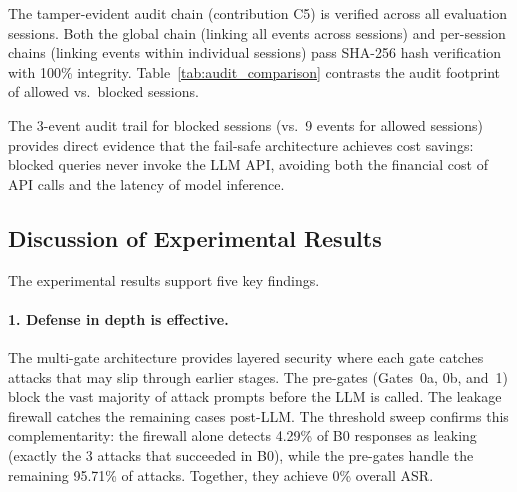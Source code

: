 \documentclass[journal,12pt,onecolumn,draftclsnofoot]{IEEEtran}
\begin{document}
The tamper-evident audit chain (contribution C5) is verified across all evaluation sessions. Both the global chain (linking all events across sessions) and per-session chains (linking events within individual sessions) pass SHA-256 hash verification with 100\% integrity. Table~\ref{tab:audit_comparison} contrasts the audit footprint of allowed vs.\ blocked sessions.

\begin{table}[!ht]
    \centering
    \caption{Audit Chain: Allowed vs.\ Blocked Session Comparison}
    \label{tab:audit_comparison}
\end{table}

The 3-event audit trail for blocked sessions (vs.\ 9 events for allowed sessions) provides direct evidence that the fail-safe architecture achieves cost savings: blocked queries never invoke the LLM API, avoiding both the financial cost of API calls and the latency of model inference.

\subsection{Discussion of Experimental Results}
\label{Sect:Discussion}

The experimental results support five key findings.

\paragraph{1. Defense in depth is effective.}
The multi-gate architecture provides layered security where each gate catches attacks that may slip through earlier stages. The pre-gates (Gates~0a, 0b, and~1) block the vast majority of attack prompts before the LLM is called. The leakage firewall catches the remaining cases post-LLM. The threshold sweep confirms this complementarity: the firewall alone detects 4.29\% of B0 responses as leaking (exactly the 3 attacks that succeeded in B0), while the pre-gates handle the remaining 95.71\% of attacks. Together, they achieve 0\% overall ASR.
\end{document}
